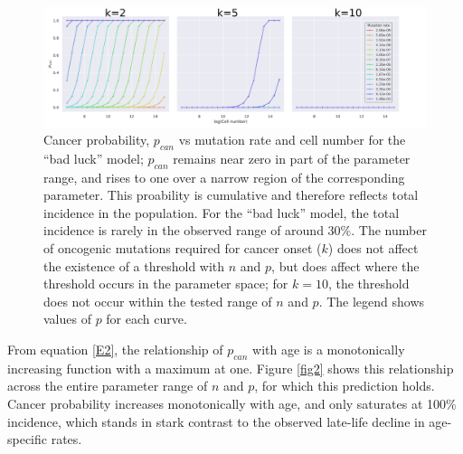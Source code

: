\documentclass[9pt,onecolumn,twoside]{pnas-new}
\begin{document}
\begin{figure}[tbhp]
	\centering
	\includegraphics[width=\linewidth]{fig1.png}
	\caption{Cancer probability, $p_{can}$ vs mutation rate and cell number for the ``bad luck'' model; $p_{can}$ remains near zero in part of the parameter range, and rises to one over a narrow region of the corresponding parameter. This proability is cumulative and therefore reflects total incidence in the population. For the ``bad luck'' model, the total incidence is rarely in the observed range of around 30\%. The number of oncogenic mutations required for cancer onset ($k$) does not affect the existence of a threshold with $n$ and $p$, but does affect where the threshold occurs in the parameter space; for $k=10$, the threshold does not occur within the tested range of $n$ and $p$. The legend shows values of $p$ for each curve.}
	\label{fig1}
\end{figure}

From equation \ref{E2}, the relationship of $p_{can}$ with age is a monotonically increasing function with a maximum at one. Figure \ref{fig2} shows this relationship across the entire parameter range of $n$ and $p$, for which this prediction holds. Cancer probability increases monotonically with age, and only saturates at 100\% incidence, which stands in stark contrast to the observed late-life decline in age-specific rates.
\end{document}
